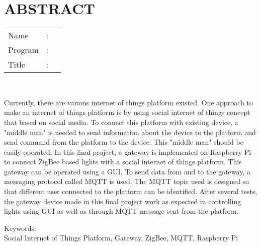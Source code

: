 %
%
%

\chapter*{ABSTRACT}

\vspace*{0.2cm}

\noindent \begin{tabular}{l l p{11.0cm}}
	Name&: & \penulis \\
	Program&: & \program \\
	Title&: & \judulInggris \\
\end{tabular} \\ 

\vspace*{0.5cm}

\noindent 
Currently, there are various internet of things platform existed. One approach to make an internet of things platform is by using social internet of things concept that based on social media. To connect this platform with existing device, a "middle man" is needed to send information about the device to the platform and send command from the platform to the device. This "middle man" should be easily operated. In this final project, a gateway is implemented on Raspberry Pi to connect ZigBee based lights with a social internet of things platform. This gateway can be operated using a GUI. To send data from and to the gateway, a messaging protocol called MQTT is used. The MQTT topic used is designed so that different user connected to the platform can be identified. After several tests, the gateway device made in this final project work as expected in controlling lights using GUI as well as through MQTT message sent from the platform.\\

\vspace*{0.2cm}

\noindent Keywords: \\ 
\noindent Social Internet of Things Platform, Gateway, ZigBee, MQTT, Raspberry Pi

\newpage